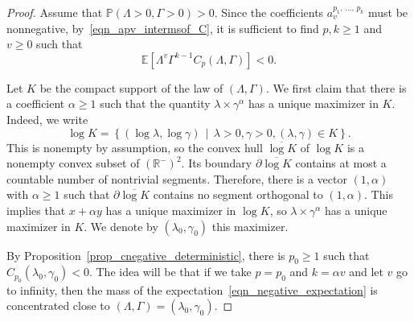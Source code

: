 \documentclass[AHL,Unicode,longabstracts,published]{cedram}
\newcommand{\R}{\mathbb{R}}
\newcommand{\E}{\mathbb{E}}
\renewcommand{\P}{\mathbb{P}}
\begin{document}
\begin{proof}
Assume that $\P (\Lambda > 0, \Gamma > 0 )>0$. Since the coefficients $a_v^{p_1,\,\dots,\,p_k}$ must be nonnegative, by~\eqref{eqn_apv_intermsof_C}, it is sufficient to find $p,k \geq 1$ and $v \geq 0$ such that
\begin{equation}\label{eqn_negative_expectation}
\E \left[\Lambda^v \Gamma^{k-1} C_p(\Lambda, \Gamma) \right] <0.
\end{equation}

Let $K$ be the compact support of the law of $(\Lambda, \Gamma)$. We first claim that there is a coefficient $\alpha \geq 1$ such that the quantity $\lambda \times \gamma^{\alpha}$ has a unique maximizer in $K$. Indeed, we write
\[
\log K = \left\{ \left(\log \lambda, \log \gamma \right)\, \middle|\, \lambda>0, \gamma>0, (\lambda, \gamma) \in K \right\}.
\]
This is nonempty by assumption, so the convex hull $\overline{\log K}$ of $\log K$ is a nonempty convex subset of $\left(\R^- \right)^2$. Its boundary $\partial \overline{\log K}$ contains at most a countable number of nontrivial segments. Therefore, there is a vector $(1,\alpha)$ with $\alpha \geq 1$ such that $\partial \overline{\log K}$ contains no segment orthogonal to $(1,\alpha)$. This implies that $x+\alpha y$ has a unique maximizer in $\log K$, so $\lambda \times \gamma^{\alpha}$ has a unique maximizer in $K$. We denote by $(\lambda_0,\gamma_0)$ this maximizer.

By Proposition~\ref{prop_cnegative_deterministic}, there is $p_0 \geq 1$ such that $C_{p_0} (\lambda_0, \gamma_0) <0$. The idea will be that if we take $p=p_0$ and $k=\alpha v$ and let $v$ go to infinity, then the mass of the expectation~\eqref{eqn_negative_expectation} is concentrated close to $(\Lambda, \Gamma)=(\lambda_0,\gamma_0)$.


\end{proof}
\end{document}
